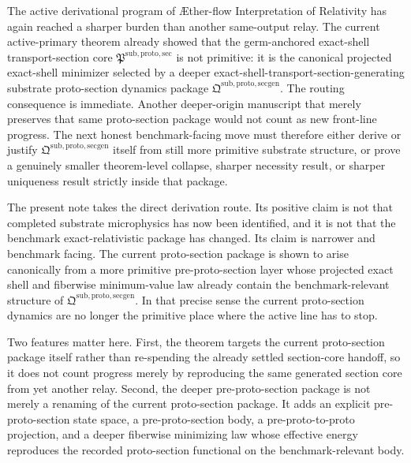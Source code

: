 \documentclass[11pt]{article}
\newcommand{\Aflow}{\AE{}ther-flow}
\newcommand{\TheoryName}{\Aflow{} Interpretation of Relativity}
\newcommand{\ProtoSectionCore}{\mathfrak P^{\mathrm{sub,proto,sec}}}
\newcommand{\ProtoSectionPackage}{\mathfrak Q^{\mathrm{sub,proto,secgen}}}
\begin{document}
The active derivational program of \TheoryName{} has again reached a sharper burden than another same-output relay. The current active-primary theorem already showed that the germ-anchored exact-shell transport-section core \(\ProtoSectionCore\) is not primitive: it is the canonical projected exact-shell minimizer selected by a deeper exact-shell-transport-section-generating substrate proto-section dynamics package \(\ProtoSectionPackage\). The routing consequence is immediate. Another deeper-origin manuscript that merely preserves that same proto-section package would not count as new front-line progress. The next honest benchmark-facing move must therefore either derive or justify \(\ProtoSectionPackage\) itself from still more primitive substrate structure, or prove a genuinely smaller theorem-level collapse, sharper necessity result, or sharper uniqueness result strictly inside that package.

The present note takes the direct derivation route. Its positive claim is not that completed substrate microphysics has now been identified, and it is not that the benchmark exact-relativistic package has changed. Its claim is narrower and benchmark facing. The current proto-section package is shown to arise canonically from a more primitive pre-proto-section layer whose projected exact shell and fiberwise minimum-value law already contain the benchmark-relevant structure of \(\ProtoSectionPackage\). In that precise sense the current proto-section dynamics are no longer the primitive place where the active line has to stop.

Two features matter here. First, the theorem targets the current proto-section package itself rather than re-spending the already settled section-core handoff, so it does not count progress merely by reproducing the same generated section core from yet another relay. Second, the deeper pre-proto-section package is not merely a renaming of the current proto-section package. It adds an explicit pre-proto-section state space, a pre-proto-section body, a pre-proto-to-proto projection, and a deeper fiberwise minimizing law whose effective energy reproduces the recorded proto-section functional on the benchmark-relevant body.
\end{document}
